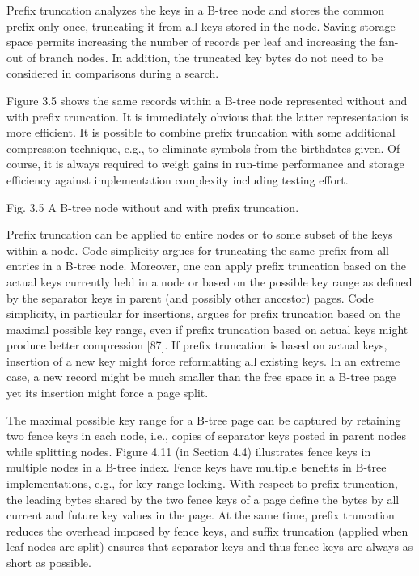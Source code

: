 Prefix truncation analyzes the keys in a B-tree node and stores the
common prefix only once, truncating it from all keys stored in the node.
Saving storage space permits increasing the number of records per leaf
and increasing the fan-out of branch nodes. In addition, the truncated
key bytes do not need to be considered in comparisons during a search.

Figure 3.5 shows the same records within a B-tree node represented
without and with prefix truncation. It is immediately obvious that the
latter representation is more efficient. It is possible to combine
prefix truncation with some additional compression technique, e.g., to
eliminate symbols from the birthdates given. Of course, it is always
required to weigh gains in run-time performance and storage efficiency
against implementation complexity including testing effort.

Fig. 3.5 A B-tree node without and with prefix truncation.

Prefix truncation can be applied to entire nodes or to some subset of
the keys within a node. Code simplicity argues for truncating the same
prefix from all entries in a B-tree node. Moreover, one can apply prefix
truncation based on the actual keys currently held in a node or based on
the possible key range as defined by the separator keys in parent (and
possibly other ancestor) pages. Code simplicity, in particular for
insertions, argues for prefix truncation based on the maximal possible
key range, even if prefix truncation based on actual keys might produce
better compression {[}87{]}. If prefix truncation is based on actual
keys, insertion of a new key might force reformatting all existing keys.
In an extreme case, a new record might be much smaller than the free
space in a B-tree page yet its insertion might force a page split.

The maximal possible key range for a B-tree page can be captured by
retaining two fence keys in each node, i.e., copies of separator keys
posted in parent nodes while splitting nodes. Figure 4.11 (in Section
4.4) illustrates fence keys in multiple nodes in a B-tree index. Fence
keys have multiple benefits in B-tree implementations, e.g., for key
range locking. With respect to prefix truncation, the leading bytes
shared by the two fence keys of a page define the bytes by all current
and future key values in the page. At the same time, prefix truncation
reduces the overhead imposed by fence keys, and suffix truncation
(applied when leaf nodes are split) ensures that separator keys and thus
fence keys are always as short as possible.

